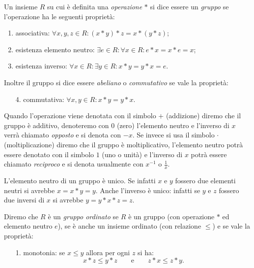 \begin{definition}[gruppo]
  \label{def:gruppo}%
  Un insieme $R$ su cui è definita una \emph{operazione} $*$ 
  si dice essere un \emph{gruppo}%
%
 se l'operazione
  ha le seguenti proprietà:
  \begin{enumerate}
    \item associativa: $\forall x,y,z\in R\colon (x*y)*z = x*(y*z)$;
    \item esistenza elemento neutro: 
    $\exists e\in R\colon \forall x\in R \colon e*x=x*e = x$;
    \item esistenza inverso: 
    $\forall x\in R\colon \exists y\in R\colon x*y=y*x=e$.
  \end{enumerate}
  Inoltre il gruppo si dice essere \emph{abeliano}%
%
 o \emph{commutativo}
  se vale la proprietà:
  \begin{enumerate}
    \item[4.] commutativa: $\forall x,y\in R\colon x*y = y*x$.
  \end{enumerate}
  
  Quando l'operazione viene denotata con il simbolo $+$ (addizione)
  diremo che il gruppo è additivo, denoteremo con $0$ 
  (zero) l'elemento neutro e l'inverso di $x$ verrà chiamato \emph{opposto}
  e si denota con $-x$.
  Se invece si usa il simbolo $\cdot$ (moltiplicazione)
  diremo che il gruppo è moltiplicativo, l'elemento neutro potrà 
  essere denotato con il simbolo $1$ (uno o unità) e 
  l'inverso di $x$ potrà essere chiamato \emph{reciproco}
  e si denota usualmente con $x^{-1}$ o $\frac 1 x$.
  \end{definition}
  
  L'elemento neutro di un gruppo è unico. 
  Se infatti $x$ e $y$ fossero due elementi neutri 
  si avrebbe $x = x*y = y$. 
  Anche l'inverso è unico: infatti se $y$ e $z$ fossero 
  due inversi di $x$ si avrebbe $y = y * x * z = z$.
  
  \begin{definition}
    \label{def:gruppo_ordinato}%
    Diremo che $R$ è un \emph{gruppo ordinato}%
%
 se $R$ è un gruppo
    (con operazione $*$ ed elemento neutro $e$),
    se è anche un insieme ordinato (con relazione $\le$)
    e se vale la proprietà:
    \begin{enumerate}
      \item[1.] monotonia: se $x\le y$ allora per ogni $z$ si ha:
       \[
       x*z \le y*z \qquad\text{e}\qquad z*x \le z*y.
       \] 
    \end{enumerate}
  \end{definition}

